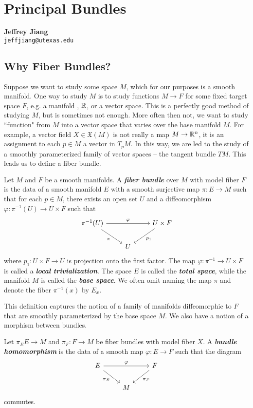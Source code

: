 \documentclass[abstract=on,twoside]{scrreprt}
\begin{document}
\chapter{Principal Bundles} %
\thispagestyle{empty}
\vspace{-2cm}
\begin{flushright}
	\textbf{Jeffrey Jiang}\\ %
	\texttt{jeffjiang@utexas.edu} %
\end{flushright}

\section*{Why Fiber Bundles?}

Suppose we want to study some space $M$, which for our purposes is a smooth manifold.
One way to study $M$ is to study functions $M \to F$ for some fixed target space $F$,
e.g. a manifold , $\mathbb{R}$, or a vector space. This is a perfectly good method
of studying $M$, but is sometimes not enough. More often then not, we want to
study ``function" from $M$ into a vector space that varies over the base
manifold $M$. For example, a vector field $X \in \mathfrak{X}(M)$ is not really
a map $M \to \mathbb{R}^n$, it is an assignment to each $p \in M$ a vector in $T_pM$.
In this way, we are led to the study of a smoothly parameterized family of
vector spaces -- the tangent bundle $TM$. This leads us to define a fiber bundle.
%
\begin{definition}
Let $M$ and $F$ be a smooth manifolds. A \textbf{\textit{fiber bundle}} over $M$ with
model fiber $F$ is the data of a smooth manifold $E$ with a smooth surjective map
$\pi : E \to M$ such that for each $p \in M$, there exists an open set $U$ and a
diffeomorphism $\varphi : \pi^{-1}(U) \to U \times F$ such that
\[\begin{tikzcd}
\pi^{-1}(U) \ar[dr, "\pi"']\ar[rr, "\varphi"] && U \times F \ar[dl, "p_1"] \\
& U
\end{tikzcd}\]
where $p_1 : U \times F \to U$ is projection onto the first factor. The map
$\varphi : \pi^{-1} \to U \times F$ is called a \textbf{\textit{local trivialization}}.
The space $E$ is called the \textbf{\textit{total space}}, while the manifold $M$
is called the \textbf{\textit{base space}}. We often omit naming the map $\pi$
and denote the fiber $\pi^{-1}(x)$ by $E_x$.
\end{definition}
%
This definition captures the notion of a family of manifolds diffeomorphic to $F$ that
are smoothly parameterized by the base space $M$. We also have a notion of a morphism
between bundles.
%
\begin{definition}
Let $\pi_E E \to M$ and $\pi_F : F \to M$ be fiber bundles with model fiber $X$. A
\textbf{\textit{bundle homomorphism}} is the data of a smooth map $\varphi : E \to F$
such that the diagram
\[\begin{tikzcd}
E \ar[dr, "\pi_E"']\ar[rr, "\varphi"] && F \ar[dl, "\pi_F"]\\
& M
\end{tikzcd}\]
commutes.
\end{definition}
\end{document}
